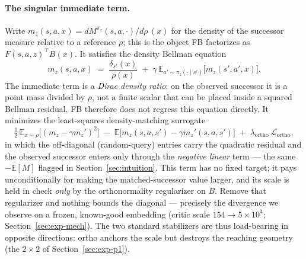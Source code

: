 \documentclass[10pt]{article}
\newcommand{\E}{\mathbb{E}}
\begin{document}
\paragraph{The singular immediate term.}
Write $m_z(s,a,x)=dM^{\pi_z}(s,a,\cdot)/d\rho\,(x)$ for the density of the successor
measure relative to a reference $\rho$; this is the object FB factorizes as
$F(s,a,z)^{\top}B(x)$.
It satisfies the density Bellman equation
\[
m_z(s,a,x)
\;=\;
\frac{\delta_{s'}(x)}{\rho(x)}
\;+\;
\gamma\,\E_{a'\sim\pi_z(\cdot\mid s')}\big[m_z(s',a',x)\big].
\]
The immediate term is a \emph{Dirac density ratio}: on the observed successor it is a
point mass divided by $\rho$, not a finite scalar that can be placed inside a squared
Bellman residual.
FB therefore does not regress this equation directly.
It minimizes the least-squares density-matching surrogate
\[
\tfrac12\,\E_{x\sim\rho}\big[(m_z-\gamma m_z')^2\big]
\;-\;
\E\big[m_z(s,a,s')-\gamma m_z'(s,a,s')\big]
\;+\;
\lambda_{\mathrm{ortho}}\,\mathcal{L}_{\mathrm{ortho}},
\]
in which the off-diagonal (random-query) entries carry the quadratic residual and the
observed successor enters only through the \emph{negative linear} term --- the same
$-\E[M]$ flagged in Section~\ref{sec:intuition}.
This term has no fixed target; it pays unconditionally for making the matched-successor
value larger, and its scale is held in check \emph{only} by the orthonormality
regularizer on $B$.
Remove that regularizer and nothing bounds the diagonal --- precisely the divergence we
observe on a frozen, known-good embedding (critic scale $154\to5\times10^{4}$;
Section~\ref{sec:exp-mech}).
The two standard stabilizers are thus load-bearing in opposite directions: ortho anchors
the scale but destroys the reaching geometry (the $2\times2$ of Section~\ref{sec:exp-p1}).
\end{document}
